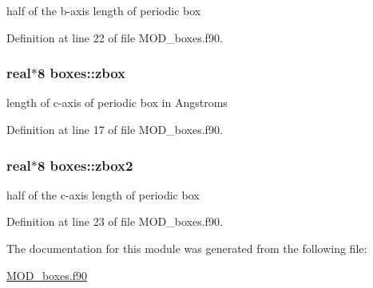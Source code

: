 half of the b-\/axis length of periodic box 



Definition at line 22 of file M\-O\-D\-\_\-boxes.\-f90.

\hypertarget{classboxes_aa2b953bb3bba616ffc87f57e29cfdf6c}{
\subsubsection[{zbox}]{\setlength{\rightskip}{0pt plus 5cm}real$\ast$8 boxes\-::zbox}}\label{classboxes_aa2b953bb3bba616ffc87f57e29cfdf6c}


length of c-\/axis of periodic box in Angstroms 



Definition at line 17 of file M\-O\-D\-\_\-boxes.\-f90.

\hypertarget{classboxes_afee188c0e895d2a9ba865dff4f81dcc5}{
\subsubsection[{zbox2}]{\setlength{\rightskip}{0pt plus 5cm}real$\ast$8 boxes\-::zbox2}}\label{classboxes_afee188c0e895d2a9ba865dff4f81dcc5}


half of the c-\/axis length of periodic box 



Definition at line 23 of file M\-O\-D\-\_\-boxes.\-f90.



The documentation for this module was generated from the following file\-:\begin{DoxyCompactItemize}
\item 
\hyperlink{MOD__boxes_8f90}{M\-O\-D\-\_\-boxes.\-f90}\end{DoxyCompactItemize}
